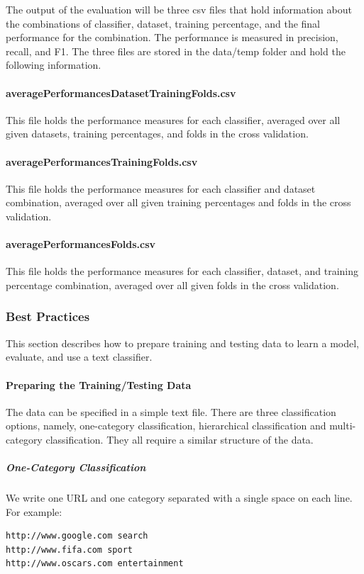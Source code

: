\documentclass[a4paper,twoside]{book}      %
\begin{document}
The output of the evaluation will be three csv files that hold information about the combinations of classifier, dataset, training percentage, and the final performance for the combination. The performance is measured in precision, recall, and F1. The three files are stored in the data/temp folder and hold the following information.

\paragraph{averagePerformancesDatasetTrainingFolds.csv} This file holds the performance measures for each classifier, averaged over all given datasets, training percentages, and folds in the cross validation.

\paragraph{averagePerformancesTrainingFolds.csv} This file holds the performance measures for each classifier and dataset combination, averaged over all given training percentages and folds in the cross validation.

\paragraph{averagePerformancesFolds.csv} This file holds the performance measures for each classifier, dataset, and training percentage combination, averaged over all given folds in the cross validation.

\subsubsection{Best Practices}
\label{sec:bpTextClassification}
This section describes how to prepare training and testing data to learn a model, evaluate, and use a text classifier.

\paragraph{Preparing the Training/Testing Data}
The data can be specified in a simple text file. There are three classification options, namely, one-category classification, hierarchical classification and multi-category classification. They all require a similar structure of the data.

\subparagraph{One-Category Classification}
We write one URL and one category separated with a single space on each line. For example:
\begin{verbatim}
http://www.google.com search
http://www.fifa.com sport
http://www.oscars.com entertainment
\end{verbatim}
\end{document}
